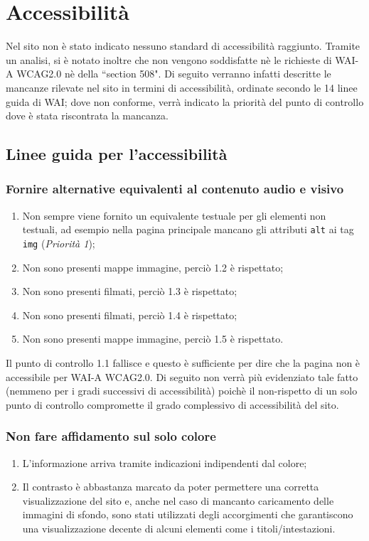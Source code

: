 \section{Accessibilità}\label{sec:accessibilita}
Nel sito non è stato indicato nessuno standard di accessibilità raggiunto.
Tramite un analisi, si è notato inoltre che non vengono soddisfatte nè le
richieste di WAI-A WCAG2.0 nè della ``section 508".
Di seguito verranno infatti descritte le mancanze rilevate nel sito in termini
di accessibilità, ordinate secondo le 14 linee guida di WAI; dove non conforme,
verrà indicato la priorità del punto di controllo dove è stata riscontrata la
mancanza.

\subsection{Linee guida per l'accessibilità}

\subsubsection{Fornire alternative equivalenti al contenuto audio e visivo}
\begin{enumerate}
\item Non sempre viene fornito un equivalente testuale per gli elementi non
testuali, ad esempio nella pagina principale mancano gli attributi \texttt{alt}
ai tag \texttt{img}
(\textit{Priorità 1});
\item Non sono presenti mappe immagine, perciò 1.2 è rispettato;
\item Non sono presenti filmati, perciò 1.3 è rispettato;
\item Non sono presenti filmati, perciò 1.4 è rispettato;
\item Non sono presenti mappe immagine, perciò 1.5 è rispettato.
\end{enumerate}

Il punto di controllo 1.1 fallisce e questo è sufficiente per dire che la
pagina non è accessibile per WAI-A WCAG2.0. Di seguito non verrà più
evidenziato tale fatto (nemmeno per i gradi successivi di accessibilità) poichè
il non-rispetto di un solo punto di controllo compromette il grado complessivo
di accessibilità del sito.

\subsubsection{Non fare affidamento sul solo colore}
\begin{enumerate}
\item L'informazione arriva tramite indicazioni indipendenti dal colore;
\item Il contrasto è abbastanza marcato da poter permettere una corretta visualizzazione del sito e, anche nel caso di mancanto caricamento delle immagini di sfondo, sono stati utilizzati degli accorgimenti che garantiscono una visualizzazione decente di alcuni elementi come i titoli/intestazioni.
\end{enumerate}

